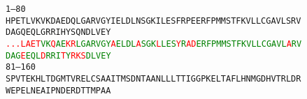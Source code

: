 \begin{figure}[H]
    \centering
    \texttt{1--80 \\
HPETLVKVKDAEDQLGARVGYIELDLNSGKILESFRPEERFPMMSTFKVLLCGAVLSRVDAGQEQLGRRIHYSQNDLVEY \\
\textcolor{red}{.}\textcolor{red}{.}\textcolor{red}{.}\textcolor{red}{L}\textcolor{red}{A}\textcolor{red}{E}\textcolor{red}{T}\textcolor{green}{V}\textcolor{green}{K}\textcolor{red}{Q}\textcolor{green}{A}\textcolor{green}{E}\textcolor{red}{K}\textcolor{red}{R}\textcolor{green}{L}\textcolor{green}{G}\textcolor{green}{A}\textcolor{green}{R}\textcolor{green}{V}\textcolor{green}{G}\textcolor{green}{Y}\textcolor{red}{A}\textcolor{green}{E}\textcolor{green}{L}\textcolor{green}{D}\textcolor{green}{L}\textcolor{red}{A}\textcolor{green}{S}\textcolor{green}{G}\textcolor{green}{K}\textcolor{red}{L}\textcolor{green}{L}\textcolor{green}{E}\textcolor{green}{S}\textcolor{red}{Y}\textcolor{green}{R}\textcolor{red}{A}\textcolor{red}{D}\textcolor{green}{E}\textcolor{green}{R}\textcolor{green}{F}\textcolor{green}{P}\textcolor{green}{M}\textcolor{green}{M}\textcolor{green}{S}\textcolor{green}{T}\textcolor{green}{F}\textcolor{green}{K}\textcolor{green}{V}\textcolor{green}{L}\textcolor{green}{L}\textcolor{green}{C}\textcolor{green}{G}\textcolor{green}{A}\textcolor{green}{V}\textcolor{green}{L}\textcolor{red}{A}\textcolor{green}{R}\textcolor{green}{V}\textcolor{green}{D}\textcolor{green}{A}\textcolor{green}{G}\textcolor{red}{E}\textcolor{green}{E}\textcolor{green}{Q}\textcolor{green}{L}\textcolor{red}{D}\textcolor{green}{R}\textcolor{green}{R}\textcolor{green}{I}\textcolor{red}{T}\textcolor{green}{Y}\textcolor{red}{R}\textcolor{red}{K}\textcolor{red}{S}\textcolor{green}{D}\textcolor{green}{L}\textcolor{green}{V}\textcolor{green}{E}\textcolor{green}{Y} \\
81--160 \\
SPVTEKHLTDGMTVRELCSAAITMSDNTAANLLLTTIGGPKELTAFLHNMGDHVTRLDRWEPELNEAIPNDERDTTMPAA \\
}
\end{figure}
